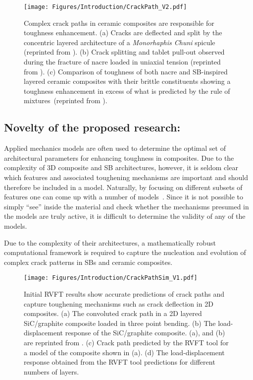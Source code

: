 \documentclass[10pt,letterpaper]{article}
\begin{document}
       \begin{figure}[h!]
         \centering
           \texttt{[image: Figures/Introduction/CrackPath\_V2.pdf]}
           \caption{ \footnotesize Complex crack paths in ceramic composites are responsible for toughness enhancement. (a) Cracks are deflected and split by the concentric layered architecture of a \textit{Monorhaphis Chuni} spicule (reprinted from \cite{Weaver:2010ew}). (b) Crack splitting and tablet pull-out observed during the fracture of nacre loaded in uniaxial tension (reprinted from \cite{wegst2015bioinspired}). (c) Comparison of toughness of both nacre and SB-inspired layered ceramic composites with their brittle constituents showing a toughness enhancement in excess of what is predicted by the rule of mixtures~(reprinted from \cite{wegst2015bioinspired}).
             }
           \label{f:hyp}
       \end{figure}

  \subsection{Novelty of the proposed research:}
    \label{s:nov}
    Applied mechanics models are often used to determine the optimal set of architectural parameters for enhancing toughness in composites. Due to the complexity of 3D composite and SB architectures, however, it is seldom clear which features and associated toughening mechanisms are important and should therefore be included in a model. Naturally, by focusing on different subsets of features one can come up with a number of models~\cite{barthelat2007mechanics,smith1999molecular,meyers2008mechanical,li2004nanoscale,lin2006mechanical,chen2013bio}. Since it is not possible to simply ``see'' inside the material and check whether the mechanisms presumed in the models are truly active, it is difficult to determine the validity of any of the models.

    Due to the complexity of their architectures, a mathematically robust computational framework is required to capture the nucleation and evolution of complex crack patterns in SBs and ceramic composites.

    \begin{figure}[h!]
      \centering
        \texttt{[image: Figures/Introduction/CrackPathSim\_V1.pdf]}
        \caption{ \footnotesize Initial RVFT results show accurate predictions of crack paths and capture toughening mechanisms such as crack deflection in 2D composites. (a) The convoluted crack path in a 2D layered SiC/graphite composite loaded in three point bending. (b) The load-displacement response of the SiC/graphite composite. (a), and (b) are reprinted from \cite{clegg1990simple}. (c) Crack path predicted by the RVFT tool for a model of the composite shown in (a). (d) The load-displacement response obtained from the RVFT tool predictions for different numbers of layers.
          }
        \label{f:sim}
    \end{figure}
\end{document}
